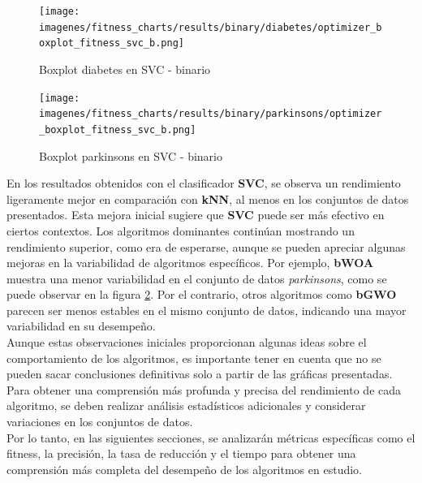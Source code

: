 \begin{figure}[htb]
    \centering
    \texttt{[image: imagenes/fitness\_charts/results/binary/diabetes/optimizer\_boxplot\_fitness\_svc\_b.png]}
    \caption{Boxplot diabetes en SVC - binario}
    \label{fig:boxplot_diabetessvc}
\end{figure}

\begin{figure}[htb]
    \centering
    \texttt{[image: imagenes/fitness\_charts/results/binary/parkinsons/optimizer\_boxplot\_fitness\_svc\_b.png]}
    \caption{Boxplot parkinsons en SVC - binario}
    \label{fig:boxplot_parkinsonssvc}
\end{figure}

En los resultados obtenidos con el clasificador \textbf{SVC}, se observa un rendimiento ligeramente mejor en comparación con \textbf{kNN}, al menos en los conjuntos de datos presentados. Esta mejora inicial sugiere que \textbf{SVC} puede ser más efectivo en ciertos contextos. Los algoritmos dominantes continúan mostrando un rendimiento superior, como era de esperarse, aunque se pueden apreciar algunas mejoras en la variabilidad de algoritmos específicos. Por ejemplo, \textbf{bWOA} muestra una menor variabilidad en el conjunto de datos \textit{parkinsons}, como se puede observar en la figura \ref{fig:boxplot_parkinsonssvc}. Por el contrario, otros algoritmos como \textbf{bGWO} parecen ser menos estables en el mismo conjunto de datos, indicando una mayor variabilidad en su desempeño.\\[6pt]
Aunque estas observaciones iniciales proporcionan algunas ideas sobre el comportamiento de los algoritmos, es importante tener en cuenta que no se pueden sacar conclusiones definitivas solo a partir de las gráficas presentadas. Para obtener una comprensión más profunda y precisa del rendimiento de cada algoritmo, se deben realizar análisis estadísticos adicionales y considerar variaciones en los conjuntos de datos.\\[6pt]
Por lo tanto, en las siguientes secciones, se analizarán métricas específicas como el fitness, la precisión, la tasa de reducción y el tiempo para obtener una comprensión más completa del desempeño de los algoritmos en estudio.

